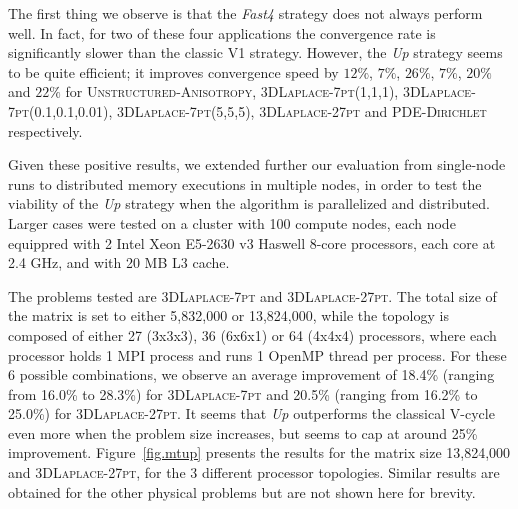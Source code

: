 The first thing we observe is that the \emph{Fast4} strategy does not
always perform well. In fact, for two of these four applications the
convergence rate is significantly slower than the classic V1 strategy.
However, the \emph{Up} strategy seems to be quite efficient; it improves
convergence speed by $12\%$, $7\%$, $26\%$, $7\%$, $20\%$ and $22\%$ for
\textsc{Unstructured-Anisotropy}, \textsc{3DLaplace-7pt(1,1,1)}, \textsc{3DLaplace-7pt(0.1,0.1,0.01)}, \textsc{3DLaplace-7pt(5,5,5)},
\textsc{3DLaplace-27pt} and \textsc{PDE-Dirichlet} respectively.

Given these positive results, we extended further our evaluation from
single-node runs to distributed memory executions in multiple nodes, in order to test
the viability of the \emph{Up} strategy when the algorithm is parallelized and
distributed. Larger cases were tested on a cluster with 100 compute nodes,
each node equippred with 2 Intel Xeon E5-2630 v3 Haswell 8-core processors,
each core at 2.4 GHz, and with 20 MB L3 cache.

The problems tested are \textsc{3DLaplace-7pt} and
\textsc{3DLaplace-27pt}.
The total size of the matrix is set to either 5,832,000 or 13,824,000, while
the topology is composed of either 27 (3x3x3), 36 (6x6x1) or 64 (4x4x4)
processors, where each processor holds 1 MPI process and runs 1 OpenMP
thread per process. 
For these 6 possible combinations, we observe an
average improvement of 18.4\% (ranging from 16.0\% to 28.3\%) for
\textsc{3DLaplace-7pt} and 20.5\% (ranging from 16.2\% to 25.0\%) for
\textsc{3DLaplace-27pt}. It seems that \emph{Up} outperforms the
classical V-cycle even more when the problem size increases, but seems to cap at around
25\% improvement. Figure~\ref{fig.mtup} presents the results for the matrix
size 13,824,000 and \textsc{3DLaplace-27pt}, for the 3 different processor
topologies. Similar results are obtained for the other physical problems but are not
shown here for brevity.


